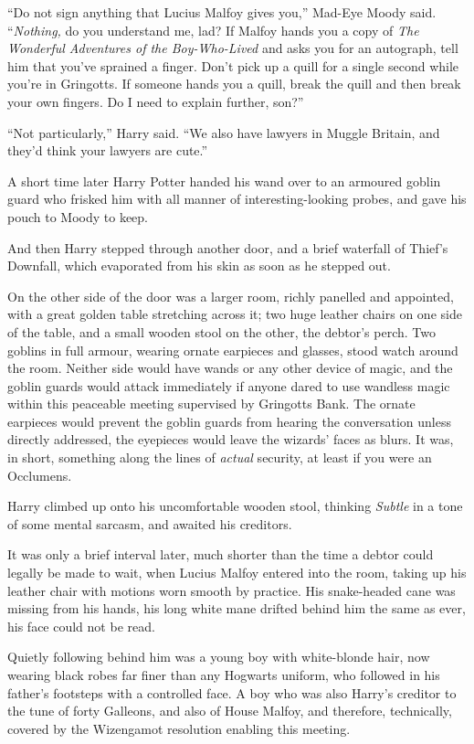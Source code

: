 “Do not sign anything that Lucius Malfoy gives you,” Mad-Eye Moody said. “\emph{Nothing,} do you understand me, lad? If Malfoy hands you a copy of \emph{The Wonderful Adventures of the Boy-Who-Lived} and asks you for an autograph, tell him that you’ve sprained a finger. Don’t pick up a quill for a single second while you’re in Gringotts. If someone hands you a quill, break the quill and then break your own fingers. Do I need to explain further, son?”

“Not particularly,” Harry said. “We also have lawyers in Muggle Britain, and they’d think your lawyers are cute.”

A short time later Harry Potter handed his wand over to an armoured goblin guard who frisked him with all manner of interesting-looking probes, and gave his pouch to Moody to keep.

And then Harry stepped through another door, and a brief waterfall of Thief’s Downfall, which evaporated from his skin as soon as he stepped out.

On the other side of the door was a larger room, richly panelled and appointed, with a great golden table stretching across it; two huge leather chairs on one side of the table, and a small wooden stool on the other, the debtor’s perch. Two goblins in full armour, wearing ornate earpieces and glasses, stood watch around the room. Neither side would have wands or any other device of magic, and the goblin guards would attack immediately if anyone dared to use wandless magic within this peaceable meeting supervised by Gringotts Bank. The ornate earpieces would prevent the goblin guards from hearing the conversation unless directly addressed, the eyepieces would leave the wizards’ faces as blurs. It was, in short, something along the lines of \emph{actual} security, at least if you were an Occlumens.

Harry climbed up onto his uncomfortable wooden stool, thinking \emph{Subtle} in a tone of some mental sarcasm, and awaited his creditors.

It was only a brief interval later, much shorter than the time a debtor could legally be made to wait, when Lucius Malfoy entered into the room, taking up his leather chair with motions worn smooth by practice. His snake-headed cane was missing from his hands, his long white mane drifted behind him the same as ever, his face could not be read.

Quietly following behind him was a young boy with white-blonde hair, now wearing black robes far finer than any Hogwarts uniform, who followed in his father’s footsteps with a controlled face. A boy who was also Harry’s creditor to the tune of forty Galleons, and also of House Malfoy, and therefore, technically, covered by the Wizengamot resolution enabling this meeting.

